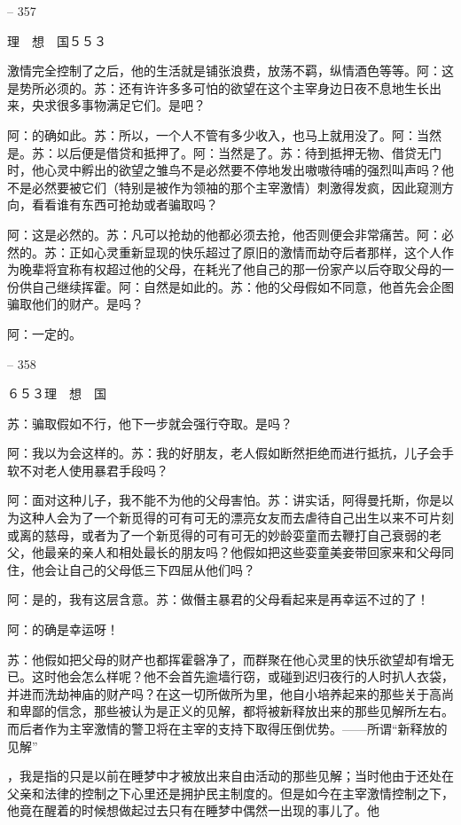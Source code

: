 \documentclass[11pt,oneside]{book}
\begin{document}
\begin{common-format}
    

-- 357

    理　想　国５５３

    激情完全控制了之后，他的生活就是铺张浪费，放荡不羁，纵情酒色等等。阿：这是势所必须的。苏：还有许许多多可怕的欲望在这个主宰身边日夜不息地生长出来，央求很多事物满足它们。是吧？

    阿：的确如此。苏：所以，一个人不管有多少收入，也马上就用没了。阿：当然是。苏：以后便是借贷和抵押了。阿：当然是了。苏：待到抵押无物、借贷无门时，他心灵中孵出的欲望之雏鸟不是必然要不停地发出嗷嗷待哺的强烈叫声吗？他不是必然要被它们（特别是被作为领袖的那个主宰激情）刺激得发疯，因此窥测方向，看看谁有东西可抢劫或者骗取吗？

    阿：这是必然的。苏：凡可以抢劫的他都必须去抢，他否则便会非常痛苦。阿：必然的。苏：正如心灵重新显现的快乐超过了原旧的激情而劫夺后者那样，这个人作为晚辈将宜称有权超过他的父母，在耗光了他自己的那一份家产以后夺取父母的一份供自己继续挥霍。阿：自然是如此的。苏：他的父母假如不同意，他首先会企图骗取他们的财产。是吗？

    阿：一定的。

    

-- 358

    ６５３理　想　国

    苏：骗取假如不行，他下一步就会强行夺取。是吗？

    阿：我以为会这样的。苏：我的好朋友，老人假如断然拒绝而进行抵抗，儿子会手软不对老人使用暴君手段吗？

    阿：面对这种儿子，我不能不为他的父母害怕。苏：讲实话，阿得曼托斯，你是以为这种人会为了一个新觅得的可有可无的漂亮女友而去虐待自己出生以来不可片刻或离的慈母，或者为了一个新觅得的可有可无的妙龄娈童而去鞭打自己衰弱的老父，他最亲的亲人和相处最长的朋友吗？他假如把这些娈童美妾带回家来和父母同住，他会让自己的父母低三下四屈从他们吗？

    阿：是的，我有这层含意。苏：做僭主暴君的父母看起来是再幸运不过的了！

    阿：的确是幸运呀！

    苏：他假如把父母的财产也都挥霍磬净了，而群聚在他心灵里的快乐欲望却有增无已。这时他会怎么样呢？他不会首先逾墙行窃，或碰到迟归夜行的人时扒人衣袋，并进而洗劫神庙的财产吗？在这一切所做所为里，他自小培养起来的那些关于高尚和卑鄙的信念，那些被认为是正义的见解，都将被新释放出来的那些见解所左右。而后者作为主宰激情的警卫将在主宰的支持下取得压倒优势。——所谓“新释放的见解”

    ，我是指的只是以前在睡梦中才被放出来自由活动的那些见解；当时他由于还处在父亲和法律的控制之下心里还是拥护民主制度的。但是如今在主宰激情控制之下，他竟在醒着的时候想做起过去只有在睡梦中偶然一出现的事儿了。他


\end{common-format}
\end{document}
